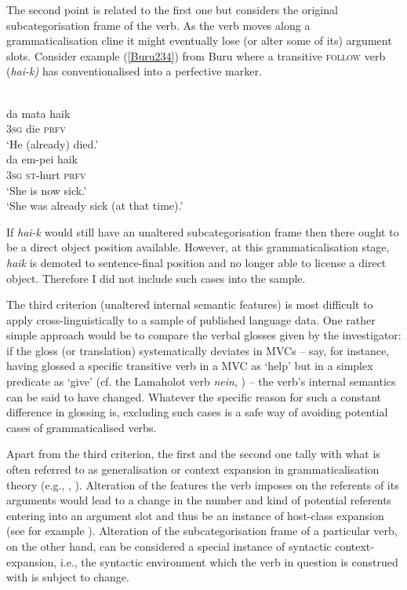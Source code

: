 The second point is related to the first one but considers the original subcategorisation frame of the verb. As the verb moves along a grammaticalisation cline it might eventually lose (or alter some of its) argument slots. Consider example (\ref{Buru234}) from Buru where a transitive \textsc{follow} verb (\textit{hai-k)} has conventionalised into a perfective marker.

\ea \label{Buru234}
\\
\ea 
\gll da mata haik \\
3\textsc{sg} die \textsc{prfv} \\
\glft `He (already) died.' \\ 
\ex 
\gll da em-pei haik \\ 
3\textsc{sg} \textsc{st}-hurt \textsc{prfv} \\
\glft `She is now sick.' \\
  `She was already sick (at that time).'\\ 
\z
\z

If \textit{hai-k} would still have an unaltered subcategorisation frame then there ought to be a direct object position available. However, at this grammaticalisation stage, \textit{haik} is demoted to sentence-final position and no longer able to license a direct object. Therefore I did not include such cases into the sample.

The third criterion (unaltered internal semantic features) is most difficult to apply cross-linguistically to a sample of published language data. One rather simple approach would be to compare the verbal glosses given by the investigator: if the gloss (or translation) systematically deviates in MVCs – say, for instance, having glossed a specific transitive verb in a MVC as `help’ but in a simplex predicate as `give’ (cf. the Lamaholot verb \textit{nein}, \citealt[118]{nishiyama2007grammar}) – the verb’s internal semantics can be said to have changed. Whatever the specific reason for such a constant difference in glossing is, excluding such cases is a safe way of avoiding potential cases of grammaticalised verbs.

Apart from the third criterion, the first and the second one tally with what is often referred to as generalisation or context expansion in grammaticalisation theory (e.g., \citealt[32]{himmelmann2004lexicalization}, \citealt[289--93]{bybee1994evolution}). Alteration of the features the verb imposes on the referents of its arguments would lead to a change in the number and kind of potential referents entering into an argument slot and thus be an instance of host-class expansion (see for example \citealt[81]{himmelmann2005gram}). Alteration of the subcategorisation frame of a particular verb, on the other hand, can be considered a special instance of syntactic context-expansion, i.e., the syntactic environment which the verb in question is construed with is subject to change. 

